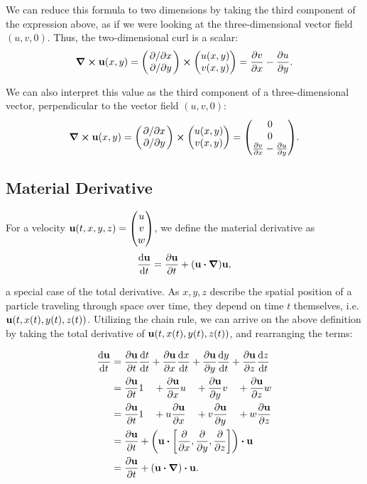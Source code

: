 We can reduce this formula to two dimensions by taking the third component of
the expression above, as if we were looking at the three-dimensional vector
field $(u,v,0)$. Thus, the two-dimensional curl is a scalar:
$$\curl{\vb{u}(x,y)} = 
    \mqty(\pdv*{x} \\ \pdv*{y}) \cross 
    \mqty(u(x,y) \\ v(x,y))
    = \pdv{v}{x} - \pdv{u}{y}.$$

We can also interpret this value as the third component of a three-dimensional
vector, perpendicular to the vector field $(u,v,0)$:
$$\curl{\vb{u}(x,y)} = 
    \mqty(\pdv*{x} \\ \pdv*{y}) \cross 
    \mqty(u(x,y) \\ v(x,y))
    = 
    \mqty(0\\0\\\pdv{v}{x} - \pdv{u}{y}).$$


\subsection*{Material Derivative}
For a velocity $\vb{u}(t,x,y,z) = \mqty(u \\ v \\ w)$, 
we define the material derivative as 
$$\dv{\vb{u}}{t} = \pdv{\vb{u}}{t} + \qty(\vb{u}\vdot\grad)\vb{u} ,$$

a special case of the total derivative. As $x, y, z$ describe the spatial
position of a particle traveling through space over time, they depend on time
$t$ themselves, i.e. $\vb{u}(t, x(t), y(t), z(t))$. Utilizing the chain rule,
we can arrive on the above definition by taking the total derivative of
$\vb{u}(t, x(t), y(t), z(t))$, and rearranging the terms:

\begin{alignat*}{2}\label{eq:material-derivative}
    \dv{\vb{u}}{t} &= \pdv{\vb{u}}{t}\dv{t}{t} 
                    + \pdv{\vb{u}}{x}\dv{x}{t} 
                    + \pdv{\vb{u}}{y}\dv{y}{t} 
                    + \pdv{\vb{u}}{z}\dv{z}{t} \\
                    &= \pdv{\vb{u}}{t} 1 \quad
                    + \pdv{\vb{u}}{x} u \quad
                    + \pdv{\vb{u}}{y} v \quad
                    + \pdv{\vb{u}}{z} w \\
                    &= \pdv{\vb{u}}{t} 1 \quad
                    + u \pdv{\vb{u}}{x} \quad
                    + v \pdv{\vb{u}}{y} \quad
                    + w \pdv{\vb{u}}{z} \\
                    &= \pdv{\vb{u}}{t} +
                    \qty(
                        \vb{u}
                        \vdot
                        \left[ \pdv{x}, \pdv{y}, \pdv{z} \right]
                    ) \vdot \vb{u} \\
                    &= \pdv{\vb{u}}{t}
                    + \qty(\vb{u}\vdot\grad)\vdot\vb{u}.
\end{alignat*}

